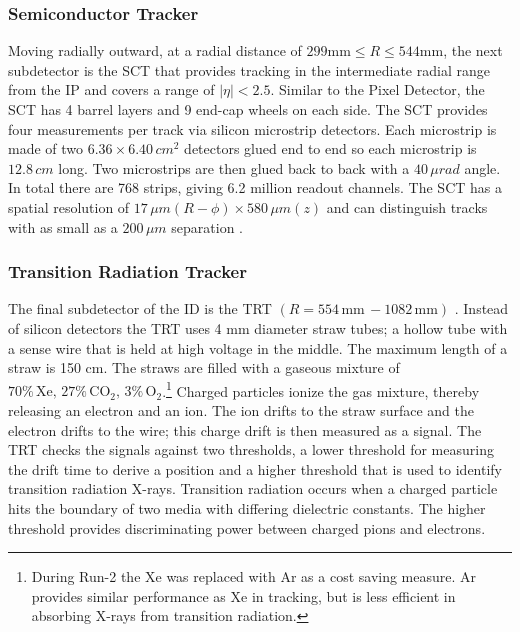 		\subsubsection{Semiconductor Tracker}\label{sssec:SCT}
			Moving radially outward, at a radial distance of $299 \mathrm{mm} \leq R \leq 544 \mathrm{mm}$, the next subdetector is the \gls{SCT} that provides tracking in the intermediate radial range from the \gls{IP} and covers a range of $|\eta| < 2.5$. Similar to the Pixel Detector, the \gls{SCT} has 4 barrel layers and 9 end-cap wheels on each side. The \gls{SCT} provides four measurements per track via silicon microstrip detectors. Each microstrip is made of two $6.36 \times 6.40 \, cm^2$ detectors glued end to end so each microstrip is $12.8 \, cm$ long. Two microstrips are then glued back to back with a $40 \, \mu rad$ angle. In total there are 768 strips, giving 6.2 million readout channels. The \gls{SCT} has a spatial resolution of $17 \, \mu m (R-\phi) \times 580 \,\mu m (z)$ and can distinguish tracks with as small as a $200 \, \mu m$ separation \cite{ATLAS-ID}.

		\subsubsection{Transition Radiation Tracker}\label{sssec:TRT}
			The final subdetector of the \gls{ID} is the \gls{TRT} $(R=554 \, \mathrm{mm} \, - 1082 \, \mathrm{mm})$ . Instead of silicon detectors the \gls{TRT} uses 4 mm diameter straw tubes; a hollow tube with a sense wire that is held at high voltage in the middle. The maximum length of a straw is 150 cm. The straws are filled with a gaseous mixture of $70\% \, \mathrm{Xe,} \, 27\% \, \mathrm{CO}_2, \, 3\% \, \mathrm{O}_2$.\footnote{During Run-2 the Xe was replaced with Ar as a cost saving measure. Ar provides similar performance as Xe in tracking, but is less efficient in absorbing X-rays from transition radiation.} Charged particles ionize the gas mixture, thereby releasing an electron and an ion. The ion drifts to the straw surface and the electron drifts to the wire; this charge drift is then measured as a signal. The \gls{TRT} checks the signals against two thresholds, a lower threshold for measuring the drift time to derive a position and a higher threshold that is used to identify transition radiation X-rays. Transition radiation occurs when a charged particle hits the boundary of two media with differing dielectric constants. The higher threshold provides discriminating power between charged pions and electrons.

